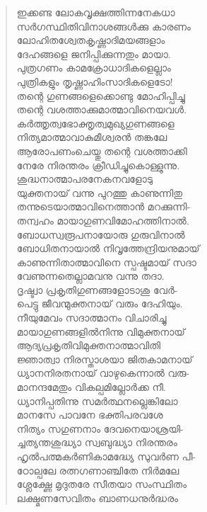 \begin{verse}
ഇക്കണ്ട ലോകവൃക്ഷത്തിന്നനേകധാ\\
സര്‍ഗസ്ഥിതിവിനാശങ്ങള്‍ക്കു കാരണം\\
ലോഹിതശ്വേതകൃഷ്ണാദിമയങ്ങളാം\\
ദേഹങ്ങളെ ജനിപ്പിക്കുന്നതും മായാ.\\
പുത്രഗണം കാമക്രോധാദികളെല്ലാം\\
പുത്രികളും തൃഷ്ണാഹിംസാദികളെടോ!\\
തന്റെ ഗുണങ്ങളെക്കൊണ്ടു മോഹിപ്പിച്ചു\\
തന്റെ വശത്താക്കുമാത്മാവിനെയവള്‍.\\
കര്‍ത്തൃത്വഭോക്തൃത്വമുഖ്യഗുണങ്ങളെ\\
നിത്യമാത്മാവാകുമീശ്വരന്‍ തങ്കലേ\\
ആരോപണംചെയ്തു തന്റെ വശത്താക്കി\\
നേരേ നിരന്തരം ക്രീഡിച്ചുകൊള്ളുന്നു.\\
ശുദ്ധനാത്മാപരനേകനവളോടു\\
യുക്തനായ് വന്നു പുറത്തു കാണുന്നിതു\\
തന്നുടെയാത്മാവിനെത്താന്‍ മറക്കുന്നി-\\
തന്വഹം മായാഗുണവിമോഹത്തിനാല്‍.\\
ബോധസ്വരൂപനായോരു ഗുരുവിനാല്‍\\
ബോധിതനായാല്‍ നിവൃത്തേന്ദ്രിയനുമായ്\\
കാണുന്നിതാത്മാവിനെ സ്പഷ്ടമായ് സദാ\\
വേണുന്നതെല്ലാമവനു വന്നു തദാ.\\
ദൃഷ്ട്വാ പ്രകൃതിഗുണങ്ങളോടാശു വേര്‍-\\
പെട്ടു ജീവന്മുക്തനായ് വരും ദേഹിയും.\\
നീയുമേവം സദാത്മാനം വിചാരിച്ചു\\
മായാഗുണങ്ങളില്‍നിന്നു വിമുക്തനായ്\\
ആദ്യപ്രകൃതിവിമുക്തനാത്മാവിതി\\
ജ്ഞാത്വാ നിരസ്താശയാ ജിതകാമനായ്\\
ധ്യാനനിരതനായ് വാഴുകെന്നാല്‍ വരു-\\
മാനന്ദമേതും വികല്പമില്ലോര്‍ക്ക നീ.\\
ധ്യാനിപ്പതിന്നു സമര്‍ത്ഥനല്ലെങ്കിലോ\\
മാനസേ പാവനേ ഭക്തിപരവശേ\\
നിത്യം സഗുണനാം ദേവനെയാശ്രയി-\\
ച്ചത്യന്തശുദ്ധ്യാ സ്വബുദ്ധ്യാ നിരന്തരം\\
ഹൃല്‍പത്മകര്‍ണികാമദ്ധ്യേ സുവര്‍ണ പീ-\\
ഠോല്പലേ രത്നഗണാഞ്ചിതേ നിര്‍മലേ\\
ശ്ലേക്ഷ്ണേ മൃദുതരേ സീതയാ സംസ്ഥിതം\\
ലക്ഷ്മണസേവിതം ബാണധനുര്‍ദ്ധരം\\

\end{verse}
